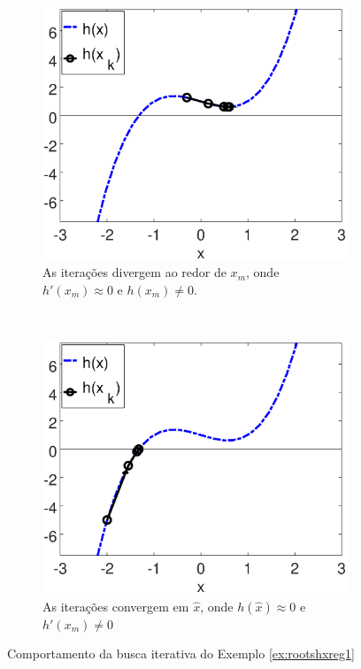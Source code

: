 \begin{figure}[!h]
    \centering
    \begin{subfigure}[b]{0.49\textwidth}
        \includegraphics[width=\textwidth]{chapters/roots/mfiles/hx_a/minimizando_hx_a_1.eps}
        \caption{As iterações divergem ao redor de $x_m$, onde $h'(x_m)\approx 0$ e $h(x_m)\neq 0$.}
        \label{fig:rootsRcasesa}
    \end{subfigure}
    ~ %
    \begin{subfigure}[b]{0.49\textwidth}
        \includegraphics[width=\textwidth]{chapters/roots/mfiles/hx_a/minimizando_hx_a_2.eps}
        \caption{As iterações convergem em $\hat{x}$, onde $h(\hat{x})\approx 0$ e $h'(x_m)\neq 0$}
        \label{fig:rootsRcasesb}
    \end{subfigure}
    \caption{Comportamento da busca iterativa do Exemplo \ref{ex:rootshxreg1}}
    \label{fig:rootsRcases}
\end{figure}

